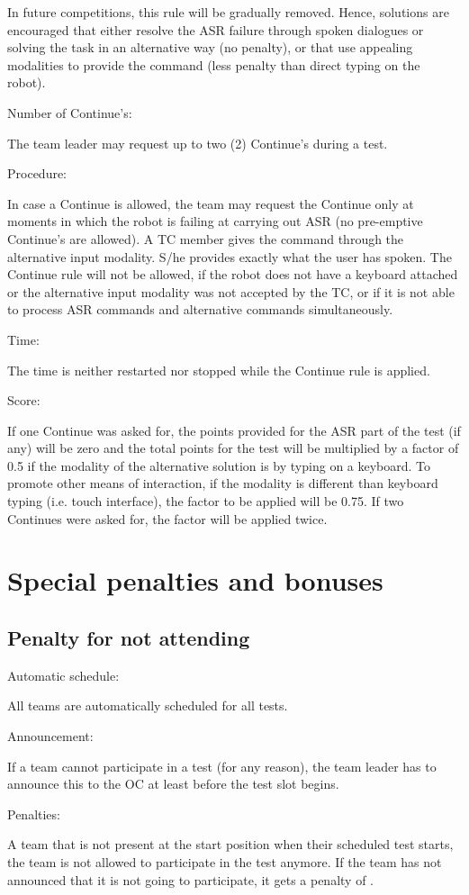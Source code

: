 In future competitions, this rule will be gradually removed. 
Hence, solutions are encouraged that either resolve the ASR failure through spoken dialogues or solving the task in an alternative way (no penalty), or that use appealing modalities to provide the command (less penalty than direct typing on the robot).

\begin{enumerate}
{\bf\item Number of Continue's:} The team leader may request up to two (2) Continue's during a test. 
{\bf\item Procedure:} In case a Continue is allowed, the team may request the Continue only at moments in which the robot is failing at carrying out ASR (no pre-emptive Continue's are allowed).
A TC member gives the command through the alternative input modality. S/he provides exactly what the user has spoken. 
The Continue rule will not be allowed, if the robot does not have a keyboard attached or the alternative input modality was not accepted by the TC, or if it is not able to process ASR commands and alternative commands simultaneously.
{\bf\item Time:} The time is neither restarted nor stopped while the Continue rule is applied.
{\bf\item Score:} If one Continue was asked for, the points provided for the ASR part of the test (if any) will be zero and the total points for the test will be multiplied by a factor of 0.5 if the modality of the alternative solution is by typing on a keyboard. To promote other means of interaction, if the modality is different than keyboard typing (i.e. touch interface), the factor to be applied will be 0.75. If two Continues were asked for, the factor will be applied twice.
\end{enumerate}




\section{Special penalties and bonuses}\label{sec:special_awards}


\subsection{Penalty for not attending}\label{rule:not_attending}
\begin{enumerate}
{\bf\item Automatic schedule:} All teams are automatically scheduled for all tests.
{\bf\item Announcement:} If a team cannot participate in a test (for any reason),
the team leader has to announce this to the OC at least  before the test slot begins.
{\bf\item Penalties:} A team that is not present at the start position when their scheduled test starts, 
the team is not allowed to participate in the test anymore. 
If the team has not announced that it is not going to participate, it gets a penalty of . 
\end{enumerate}

